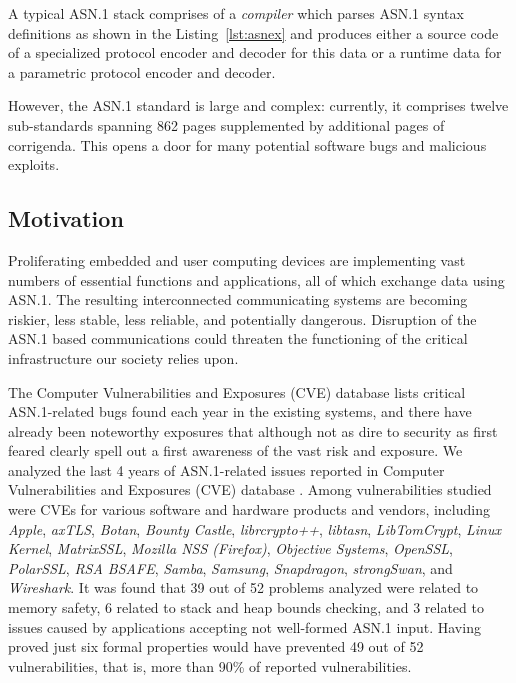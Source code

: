 \documentclass[acmsmall,nonacm]{acmart}
\begin{document}
A typical ASN.1 stack comprises of a \textit{compiler} which parses
ASN.1 syntax definitions as shown in the Listing~\ref{lst:asnex} and
produces either a source code of a specialized protocol encoder and
decoder for this data or a runtime data for a parametric protocol
encoder and decoder.

However, the ASN.1 standard \cite{TODO} is large and complex:
currently, it comprises twelve sub-standards spanning 862 pages
supplemented by additional pages of corrigenda\cite{TODO}. This opens
a door for many potential software bugs and malicious exploits.
  
\subsection{Motivation}

Proliferating embedded and user computing devices are implementing
vast numbers of essential functions and applications, all of which
exchange data using ASN.1. The resulting interconnected communicating
systems are becoming riskier, less stable, less reliable, and
potentially dangerous. Disruption of the ASN.1 based communications
could threaten the functioning of the critical infrastructure our
society relies upon.


The Computer Vulnerabilities and Exposures (CVE) database
\cite{TODO:7a} lists critical ASN.1-related bugs found each year in
the existing systems, and there have already been noteworthy exposures
\cite{TODO:8} that although not as dire to security as first feared
\cite{TODO:9} clearly spell out a first awareness of the vast risk and
exposure. We analyzed the last 4 years of ASN.1-related issues
reported in Computer Vulnerabilities and Exposures (CVE) database
\cite{TODO:7b}. Among vulnerabilities studied were CVEs for various
software and hardware products and vendors, including \textit{Apple},
\textit{axTLS}, \textit{Botan}, \textit{Bounty Castle},
\textit{librcrypto++}, \textit{libtasn}, \textit{LibTomCrypt},
\textit{Linux Kernel}, \textit{MatrixSSL}, \textit{Mozilla NSS
  (Firefox)}, \textit{Objective Systems}, \textit{OpenSSL},
\textit{PolarSSL}, \textit{RSA BSAFE}, \textit{Samba},
\textit{Samsung}, \textit{Snapdragon}, \textit{strongSwan}, and
\textit{Wireshark}. It was found that 39 out of 52 problems analyzed
were related to memory safety, 6 related to stack and heap bounds
checking, and 3 related to issues caused by applications accepting not
well-formed ASN.1 input. Having proved just six formal properties
would have prevented 49 out of 52 vulnerabilities, that is, more than
90\% of reported vulnerabilities.
\end{document}
